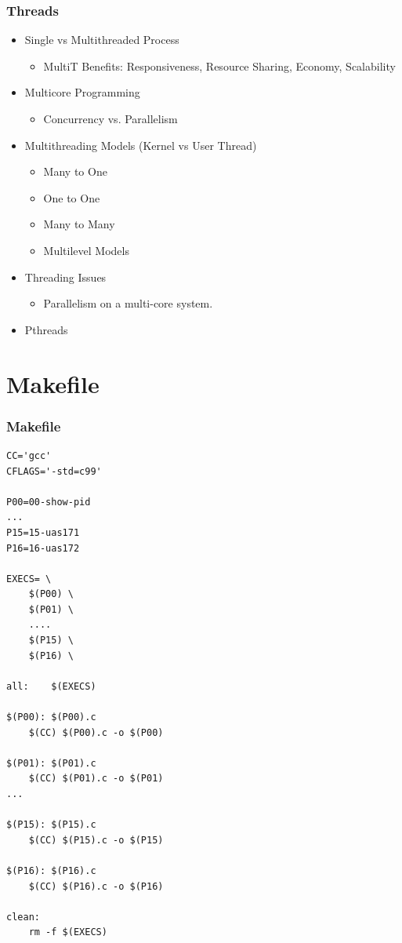 \documentclass[xcolor=table, notheorems, hyperref={pdfpagelabels=false}]{beamer}
\begin{document}
\begin{frame}
\frametitle{Threads}
\begin{itemize}
\item Single vs Multithreaded Process
\begin{itemize}
\item MultiT Benefits: Responsiveness, Resource Sharing, Economy, Scalability
\end{itemize}
\item Multicore Programming
\begin{itemize}
\item Concurrency vs. Parallelism
\end{itemize}
\item Multithreading Models (Kernel vs User Thread)
\begin{itemize}
\item Many to One
\item One to One
\item Many to Many
\item Multilevel Models
\end{itemize}
\item Threading Issues
\begin{itemize}
\item Parallelism on a multi-core system.
\end{itemize}
\item Pthreads
\end{itemize}
\end{frame}

\section{Makefile}
\begin{frame}[fragile]
\frametitle{Makefile}
\begin{lstlisting}[basicstyle=\ttfamily\tiny]
CC='gcc'
CFLAGS='-std=c99'
 
P00=00-show-pid
...
P15=15-uas171
P16=16-uas172

EXECS= \
	$(P00) \
	$(P01) \
	....
	$(P15) \
	$(P16) \

all:	$(EXECS)

$(P00): $(P00).c
	$(CC) $(P00).c -o $(P00)

$(P01): $(P01).c
	$(CC) $(P01).c -o $(P01)
...

$(P15): $(P15).c
	$(CC) $(P15).c -o $(P15)

$(P16): $(P16).c
	$(CC) $(P16).c -o $(P16)

clean:
	rm -f $(EXECS)
\end{lstlisting}
\end{frame}
\end{document}
